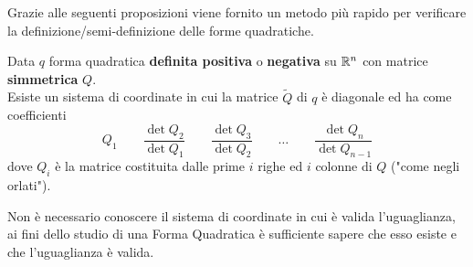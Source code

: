 \begin{appendices}
\vspace*{\baselineskip}
Grazie alle seguenti proposizioni viene fornito un metodo più rapido per verificare la definizione/semi-definizione delle forme quadratiche.
\begin{proposition}
	\label{prop:gram_schm}
	Data $q$ forma quadratica \textbf{definita positiva} o \textbf{negativa} su $\mathbb{R}^n$ con matrice \textbf{simmetrica} $Q$.\\
	Esiste un sistema di coordinate in cui la matrice $\tilde{Q}$ di $q$ è diagonale ed ha come coefficienti
	\[Q_1 \qquad \frac{\det Q_2}{\det Q_1} \qquad \frac{\det Q_3}{\det Q_2} \qquad \dotsc \qquad \frac{\det Q_n}{\det Q_{n-1}}\]
	dove $Q_i$ è la matrice costituita dalle prime $i$ righe ed $i$ colonne di $Q$ ("come negli orlati").
	\begin{note}
		Non è necessario conoscere il sistema di coordinate in cui è valida l'uguaglianza, ai fini dello studio di
		una Forma Quadratica è sufficiente sapere che esso esiste e che l'uguaglianza è valida.
	\end{note}
	\begin{center}
\end{center}
\end{proposition}
\end{appendices}
